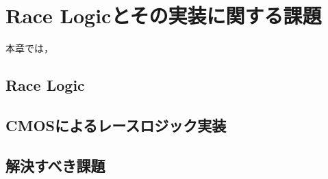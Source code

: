 \chapter{Race Logicとその実装に関する課題}
本章では，
\section{Race Logic}
\section{CMOSによるレースロジック実装}
\section{解決すべき課題}
